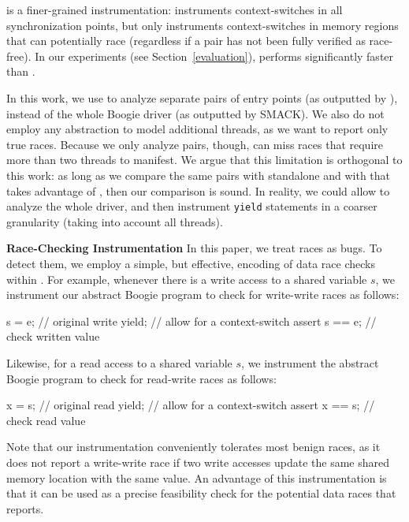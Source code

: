 \yieldmr is a finer-grained instrumentation: \whoop instruments context-switches
in all synchronization points, but only instruments context-switches in memory
regions that can potentially race (regardless if a pair has not been fully
verified as race-free). In our experiments (see Section~\ref{evaluation}),
\yieldmr performs significantly faster than \yieldcoarse.

In this work, we use \corral to analyze separate pairs of entry points (as outputted by \whoop), instead of the whole Boogie driver (as outputted by SMACK). We also do not employ any abstraction to model additional threads, as we want \corral to report only true races. Because we only analyze pairs, though, \corral can miss races that require more than two threads to manifest. We argue that this limitation is orthogonal to this work: as long as we compare the same pairs with standalone \corral and with \corral that takes advantage of \whoop, then our comparison is sound. In reality, we could allow \corral to analyze the whole driver, and then instrument \texttt{yield} statements in a coarser granularity (taking into account all threads).

\medskip\noindent\textbf{Race-Checking Instrumentation }
%
In this paper, we treat races as bugs. To detect them, we employ a simple, but effective, encoding of data race checks within \corral. For example, whenever there is a write access to a shared variable $s$, we instrument our abstract Boogie program to check for write-write races as follows:
%
\begin{boogie}
s = e;         // original write
yield;         // allow for a context-switch
assert s == e; // check written value
\end{boogie}
%
Likewise, for a read access to a shared variable $s$, we instrument the abstract Boogie program to check for read-write races as follows:
%
\begin{boogie}
x = s;         // original read
yield;         // allow for a context-switch
assert x == s; // check read value
\end{boogie}

Note that our instrumentation conveniently tolerates most benign races, as it does not report a write-write race if two write accesses update the same shared memory location with the same value.  An advantage of this instrumentation is that it can be used as a precise feasibility check for the potential data races that \whoop reports.
